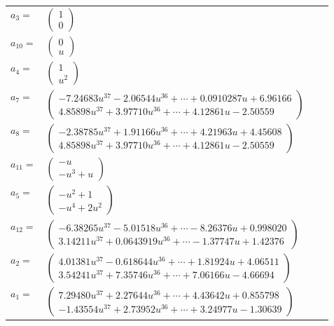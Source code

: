 \documentclass[1p]{elsarticle_modified}
\theoremstyle{definition}
\begin{document}
\begin{tabular}{m{7pt} m{180pt} m{7pt} m{180pt} }
\flushright $a_{3}=$&$\begin{pmatrix}1\\0\end{pmatrix}$ \\
\flushright $a_{10}=$&$\begin{pmatrix}0\\u\end{pmatrix}$ \\
\flushright $a_{4}=$&$\begin{pmatrix}1\\u^2\end{pmatrix}$ \\
\flushright $a_{7}=$&$\begin{pmatrix}-7.24683 u^{37}-2.06544 u^{36}+\cdots+0.0910287 u+6.96166\\4.85898 u^{37}+3.97710 u^{36}+\cdots+4.12861 u-2.50559\end{pmatrix}$ \\
\flushright $a_{8}=$&$\begin{pmatrix}-2.38785 u^{37}+1.91166 u^{36}+\cdots+4.21963 u+4.45608\\4.85898 u^{37}+3.97710 u^{36}+\cdots+4.12861 u-2.50559\end{pmatrix}$ \\
\flushright $a_{11}=$&$\begin{pmatrix}- u\\- u^3+u\end{pmatrix}$ \\
\flushright $a_{5}=$&$\begin{pmatrix}- u^2+1\\- u^4+2 u^2\end{pmatrix}$ \\
\flushright $a_{12}=$&$\begin{pmatrix}-6.38265 u^{37}-5.01518 u^{36}+\cdots-8.26376 u+0.998020\\3.14211 u^{37}+0.0643919 u^{36}+\cdots-1.37747 u+1.42376\end{pmatrix}$ \\
\flushright $a_{2}=$&$\begin{pmatrix}4.01381 u^{37}-0.618644 u^{36}+\cdots+1.81924 u+4.06511\\3.54241 u^{37}+7.35746 u^{36}+\cdots+7.06166 u-4.66694\end{pmatrix}$ \\
\flushright $a_{1}=$&$\begin{pmatrix}7.29480 u^{37}+2.27644 u^{36}+\cdots+4.43642 u+0.855798\\-1.43554 u^{37}+2.73952 u^{36}+\cdots+3.24977 u-1.30639\end{pmatrix}$ \\

\end{tabular}
\end{document}

